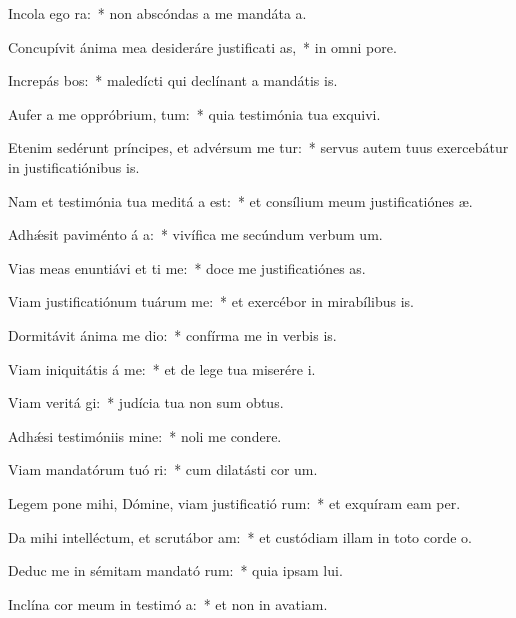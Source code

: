 \item Incola ego   ra:~* non abscóndas a me mandáta a.
\item Concupívit ánima mea desideráre justificati as,~* in omni pore.
\item Increpás bos:~* maledícti qui declínant a mandátis is.
\item Aufer a me oppróbrium,  tum:~* quia testimónia tua exquivi.
\item Etenim sedérunt príncipes, et advérsum me tur:~* servus autem tuus exercebátur in justificatiónibus is.
\item Nam et testimónia tua meditá a est:~* et consílium meum justificatiónes æ.
\item Adhǽsit paviménto á a:~* vivífica me secúndum verbum um.
\item Vias meas enuntiávi et ti me:~* doce me justificatiónes as.
\item Viam justificatiónum tuárum  me:~* et exercébor in mirabílibus is.
\item Dormitávit ánima me  dio:~* confírma me in verbis is.
\item Viam iniquitátis á  me:~* et de lege tua miserére i.
\item Viam veritá gi:~* judícia tua non sum obtus.
\item Adhǽsi testimóniis  mine:~* noli me condere.
\item Viam mandatórum tuó ri:~* cum dilatásti cor um.
\item Legem pone mihi, Dómine, viam justificatió rum:~* et exquíram eam per.
\item Da mihi intelléctum, et scrutábor  am:~* et custódiam illam in toto corde o.
\item Deduc me in sémitam mandató rum:~* quia ipsam lui.
\item Inclína cor meum in testimó a:~* et non in avatiam.
